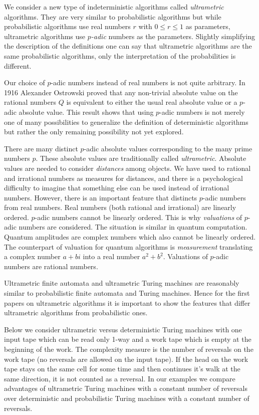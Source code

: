 \documentclass{llncs}
\begin{document}
We consider a new type of indeterministic algorithms called {\em ultrametric} algorithms. They are very similar to probabilistic algorithms but while probabilistic algorithms use real numbers $r$ with $0 \leq r \leq 1$ as parameters, ultrametric algorithms use {\em $p$-adic} numbers as the parameters.
Slightly simplifying the description of the definitions one can say that ultrametric algorithms are the same probabilistic algorithms, only the interpretation of the probabilities is different. 

Our choice of $p$-adic numbers instead of real numbers is not quite arbitrary. In 1916 Alexander Ostrowski 
proved that any non-trivial absolute value on the rational numbers $Q$ is equivalent to either the usual real absolute value or a $p$-adic absolute value.
This result shows that using $p$-adic numbers is not merely one of many possibilities to generalize the definition of deterministic algorithms but rather the only remaining possibility not yet explored.

There are many distinct $p$-adic absolute values corresponding to the many prime numbers $p$. These absolute values are traditionally  called {\em ultrametric}. 
Absolute values are needed to consider {\em distances} among objects. We have used to rational and irrational numbers as measures for distances, and there is a psychological difficulty to imagine that something else can be used instead of irrational numbers.
However, there is an important feature that distincts $p$-adic numbers from real numbers. Real numbers (both rational and irrational) are linearly ordered.
$p$-adic numbers cannot be linearly ordered. This is why {\em valuations} of $p$-adic numbers are considered. The situation is similar in quantum computation. Quantum amplitudes are complex numbers which also cannot be linearly ordered. The counterpart of valuation for quantum algorithms is {\em measurement} translating a complex number $a + bi$ into a real number $a^2 + b^2$. Valuations of $p$-adic numbers are rational numbers.

Ultrametric finite automata and ultrametric Turing machines are reasonably similar to probabilistic finite automata and Turing machines. Hence for the first papers on ultrametric algorithms it is important to show the features that differ ultrametric algorithms from probabilistic ones.


Below  we consider ultrametric versus deterministic Turing machines with one input tape which can be read only 1-way and a work tape which is empty at the beginning of the work.
The complexity measure is the number of reversals on the work tape (no reversals are allowed on the input tape). If the head on the work tape stays on the same cell for some time and then continues it's
walk at the same direction, it is not counted as a reversal. In our examples we compare advantages of ultrametric Turing machines with a constant number of reversals over deterministic and probabilistic Turing machines with a constant number of reversals.
\end{document}
